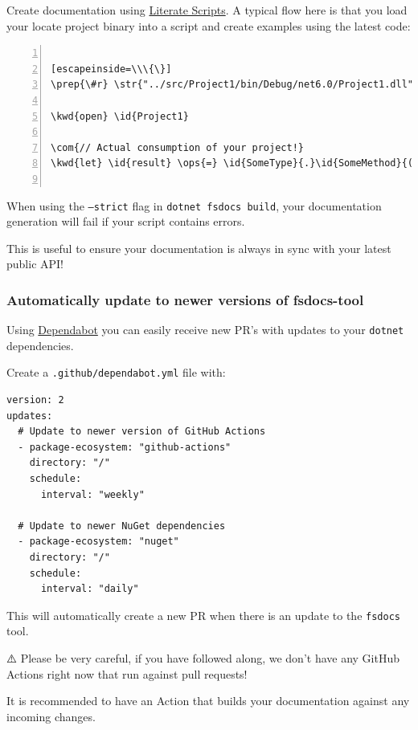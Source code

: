 \documentclass{article}
\newcommand{\id}[1]{\textcolor{black}{#1}}
\newcommand{\com}[1]{\textcolor{officegreen}{#1}}
\newcommand{\kwd}[1]{\textcolor{navy}{#1}}
\newcommand{\ops}[1]{\textcolor{purple}{#1}}
\newcommand{\prep}[1]{\textcolor{purple}{#1}}
\newcommand{\str}[1]{\textcolor{olive}{#1}}
\begin{document}
Create documentation using \href{../literate.html}{Literate Scripts}. A typical flow here is that you load your locate project binary into a script and create examples using the latest code:
\begin{lstlisting}[numbers=left]

[escapeinside=\\\{\}]
\prep{\#r} \str{"../src/Project1/bin/Debug/net6.0/Project1.dll"}

\kwd{open} \id{Project1}

\com{// Actual consumption of your project!}
\kwd{let} \id{result} \ops{=} \id{SomeType}{.}\id{SomeMethod}{(}\str{"foo"}{)}


\end{lstlisting}



When using the \texttt{--strict} flag in \texttt{dotnet fsdocs build}, your documentation generation will fail if your script contains errors.

This is useful to ensure your documentation is always in sync with your latest public API!
\subsubsection*{Automatically update to newer versions of fsdocs-tool}



Using \href{https://docs.github.com/en/code-security/dependabot/dependabot-version-updates/about-dependabot-version-updates}{Dependabot} you can easily receive new PR's with updates to your \texttt{dotnet} dependencies.


Create a \texttt{.github/dependabot.yml} file with:
\begin{lstlisting}
version: 2
updates:
  # Update to newer version of GitHub Actions
  - package-ecosystem: "github-actions"
    directory: "/"
    schedule:
      interval: "weekly"

  # Update to newer NuGet dependencies
  - package-ecosystem: "nuget"
    directory: "/"
    schedule:
      interval: "daily"

\end{lstlisting}


This will automatically create a new PR when there is an update to the \texttt{fsdocs} tool.


⚠️ P️lease be very careful, if you have followed along, we don't have any GitHub Actions right now that run against pull requests!

It is recommended to have an Action that builds your documentation against any incoming changes.
\end{document}
